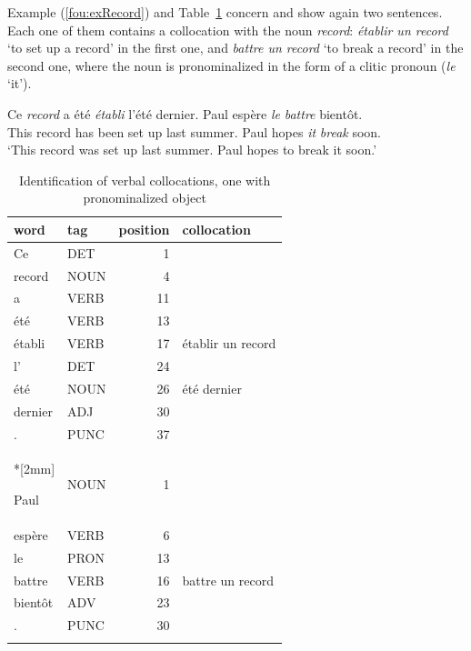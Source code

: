 \documentclass[output=paper]{langsci/langscibook}
\begin{document}
Example (\ref{fou:exRecord}) %
and Table~\ref{fou:fig3} concern  and show again two sentences. Each one of them contains a collocation with the noun \textit{record}: \textit{établir un record} `to set up a record' in the first one,  and \textit{battre un record} `to break a record' in the second one, where the noun is pronominalized in the form of a clitic pronoun (\textit{le} `it').

\ea\label{fou:exRecord}
 \gll Ce \textit{record} a été \textit{établi} l'été dernier. Paul espère \textit{le} \textit{battre} bientôt.\\
 This record has been {set up} last summer. Paul hopes \textit{it} \textit{break} soon.\\
 \glt `This record was set up last summer. Paul hopes to break it soon.'
\z

\begin{table}[h]
  {\small 
    \begin{tabular}{llrl}
      \lsptoprule
      word & tag & position & collocation \\ %
      \midrule
      Ce &	DET &	1	\\
      record &	NOUN	 & 4	\\	
      a	& VERB & 	11	\\
      été &	VERB & 	13		\\
      établi	 & VERB	 & 17	 & 	établir un record\\
      l' &	DET & 	24	\\
      été	 & NOUN	 & 26		 & 	été dernier\\
      dernier & 	ADJ	 & 30			\\
      .	 & PUNC	 & 37		\\*[2mm]

      Paul & 	NOUN	 & 1\\
      espère & 	VERB & 	6	\\
      le	 & PRON & 13	\\
      battre & 	VERB	 & 16	  & 	battre un record\\
      bientôt & ADV	 & 23			\\
      .	 & PUNC & 	30			\tabularnewline
      \lspbottomrule
\end{tabular}
  }
 \caption{\label{fou:fig3}Identification of verbal collocations, one with pronominalized object}
\end{table} 
\end{document}
